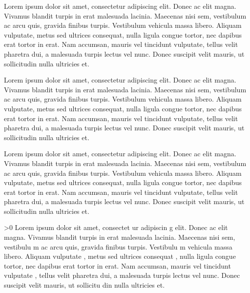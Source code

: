 \begin{something}
	Lorem ipsum dolor sit amet, consectetur adipiscing elit. Donec ac elit magna. Vivamus blandit turpis in erat malesuada lacinia. Maecenas nisi sem, vestibulum ac arcu quis, gravida finibus turpis.  Vestibulum vehicula massa libero. Aliquam vulputate, metus sed ultrices consequat, nulla ligula congue tortor, nec dapibus erat tortor in erat. Nam accumsan, mauris vel tincidunt vulputate, tellus velit pharetra dui, a malesuada turpis lectus vel nunc. Donec suscipit velit mauris, ut sollicitudin nulla ultricies et.
\end{something}
\begin{another}
	Lorem ipsum dolor sit amet,
	consectetur adipiscing elit.
	Donec ac elit magna. Vivamus
	blandit turpis in erat
	malesuada lacinia. Maecenas
	nisi sem, vestibulum ac arcu
	quis, gravida finibus turpis.
	 Vestibulum vehicula massa
	libero. Aliquam vulputate,
	metus sed ultrices consequat,
	nulla ligula congue tortor,
	nec dapibus erat tortor in
	erat. Nam accumsan, mauris
	vel tincidunt vulputate,
	tellus velit pharetra dui, a
	malesuada turpis lectus vel
	nunc. Donec suscipit velit
	mauris, ut sollicitudin nulla
	ultricies et.
\end{another}
\begin{cmh}
	Lorem ipsum dolor sit amet, consectetur adipiscing elit. Donec ac elit magna. Vivamus blandit turpis in erat malesuada lacinia. Maecenas nisi sem, vestibulum ac arcu quis, gravida finibus turpis.  Vestibulum vehicula massa libero. Aliquam vulputate, metus sed ultrices consequat, nulla ligula congue tortor, nec dapibus erat tortor in erat. Nam accumsan, mauris vel tincidunt vulputate, tellus velit pharetra dui, a malesuada turpis lectus vel nunc. Donec suscipit velit mauris, ut sollicitudin nulla ultricies et.
\end{cmh}
\ifnum\x>0
	Lorem
	ipsum
	dolor sit
	amet,
	consectet
	ur
	adipiscin
	g elit.
	Donec ac
	elit
	magna.
	Vivamus
	blandit
	turpis in
	erat
	malesuada
	lacinia.
	Maecenas
	nisi sem,
	vestibulu
	m ac arcu
	quis,
	gravida
	finibus
	turpis.
	Vestibulu
	m
	vehicula
	massa
	libero.
	Aliquam
	vulputate
	, metus
	sed
	ultrices
	consequat
	, nulla
	ligula
	congue
	tortor,
	nec
	dapibus
	erat
	tortor in
	erat. Nam
	accumsan,
	mauris
	vel
	tincidunt
	vulputate
	, tellus
	velit
	pharetra
	dui, a
	malesuada
	turpis
	lectus
	vel nunc.
	Donec
	suscipit
	velit
	mauris,
	ut
	sollicitu
	din nulla
	ultricies
	et.
\fi
